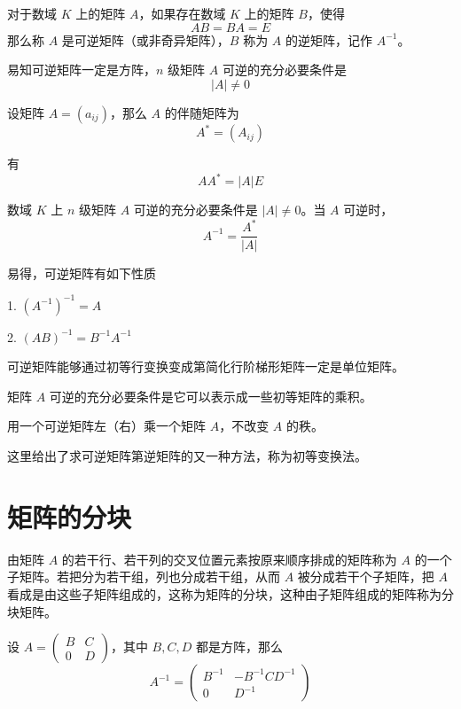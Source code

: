 \begin{definition}
	对于数域 $K$ 上的矩阵 $A$，如果存在数域 $K$ 上的矩阵 $B$，使得
	\[AB = BA = E\]
	那么称 $A$ 是可逆矩阵（或非奇异矩阵），$B$ 称为 $A$ 的逆矩阵，记作 $A^{-1}$。
\end{definition}

易知可逆矩阵一定是方阵，$n$ 级矩阵 $A$ 可逆的充分必要条件是
\[|A| \ne 0\]

\begin{definition}
	设矩阵 $A = (a_{ij})$，那么 $A$ 的伴随矩阵为
	\[A^*=(A_{ij})\]
\end{definition}

有
\[AA^* = |A|E\]

\begin{theorem}
	数域 $K$ 上 $n$ 级矩阵 $A$ 可逆的充分必要条件是 $|A| \ne 0$。当 $A$ 可逆时，
	\[A^{-1} = \frac{A^*}{|A|}\]
\end{theorem}

易得，可逆矩阵有如下性质

1. $(A^{-1})^{-1} = A$

2. $(AB)^{-1} = B^{-1}A^{-1}$

可逆矩阵能够通过初等行变换变成第简化行阶梯形矩阵一定是单位矩阵。

\begin{theorem}
	矩阵 $A$ 可逆的充分必要条件是它可以表示成一些初等矩阵的乘积。
\end{theorem}

用一个可逆矩阵左（右）乘一个矩阵 $A$，不改变 $A$ 的秩。

这里给出了求可逆矩阵第逆矩阵的又一种方法，称为初等变换法。

\section{矩阵的分块}

由矩阵 $A$ 的若干行、若干列的交叉位置元素按原来顺序排成的矩阵称为 $A$ 的一个子矩阵。若把分为若干组，列也分成若干组，从而 $A$ 被分成若干个子矩阵，把 $A$ 看成是由这些子矩阵组成的，这称为矩阵的分块，这种由子矩阵组成的矩阵称为分块矩阵。

\begin{theorem}
	设 $A = \left(\begin{matrix} B & C\\ 0 & D \end{matrix}\right)$，其中 $B,C,D$ 都是方阵，那么
	\[A^{-1} = \left(\begin{matrix} B^{-1} & -B^{-1}CD^{-1}\\ 0 & D^{-1} \end{matrix}\right)\]
\end{theorem}

